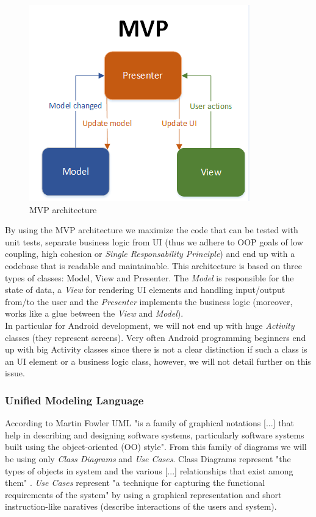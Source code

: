 \documentclass{article}[11]
\begin{document}
	\begin{figure}
		\centering
		\includegraphics{./imgs/MVP}
		\caption{MVP architecture \cite{MVPPhoto}}
	\end{figure}
	
	 By using the \ac{MVP} architecture we maximize the code that can be tested with unit tests, separate business logic from UI (thus we adhere to OOP goals of low coupling, high cohesion or \emph{Single Responsability Principle}) and  end up with a codebase that is readable and maintainable.  This architecture is based on three types of classes: Model, View and Presenter. The \emph{Model} is responsible for the state of data, a \emph{View} for rendering UI elements and handling input/output from/to the user and the \emph{Presenter}  implements the business logic (moreover, works like a glue between the \emph{View} and \emph{Model}).\\
	
	 In particular for Android development, we will not end up with huge \emph{Activity} classes (they represent screens). Very often Android programming beginners end up with big Activity classes since there is not a clear distinction if such a class is an UI element or a business logic class, however, we will not detail further on this issue.
	
	\subsubsection{Unified Modeling Language}
	According to Martin Fowler \cite{fowler2004uml} \ac{UML} "is a family of graphical notations [...] that help in describing and designing software systems, particularly software systems built using the object-oriented (OO) style". From this family of diagrams we will be using only \emph{Class Diagrams}  and \emph{Use Cases}. Class Diagrams represent "the types of objects in system and the various [...] relationships that exist among them" \cite{fowler2004uml}. \emph{Use Cases} represent "a technique for capturing the functional requirements of the system"\cite{fowler2004uml} by using a graphical representation and  short instruction-like naratives (describe interactions of the users and system).
\end{document}

